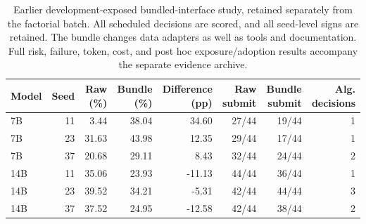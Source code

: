\begin{table}[t]
\centering\small
\setlength{\tabcolsep}{4pt}
\begin{tabular}{lrrrrrrr}
\toprule
Model & Seed & Raw (\%) & Bundle (\%) & Difference (pp) & Raw submit & Bundle submit & Alg. decisions \\
\midrule
7B & 11 & 3.44 & 38.04 & 34.60 & 27/44 & 19/44 & 1 \\
7B & 23 & 31.63 & 43.98 & 12.35 & 29/44 & 17/44 & 1 \\
7B & 37 & 20.68 & 29.11 & 8.43 & 32/44 & 24/44 & 2 \\
14B & 11 & 35.06 & 23.93 & -11.13 & 44/44 & 36/44 & 1 \\
14B & 23 & 39.52 & 34.21 & -5.31 & 42/44 & 44/44 & 3 \\
14B & 37 & 37.52 & 24.95 & -12.58 & 42/44 & 38/44 & 2 \\
\bottomrule
\end{tabular}
\caption{Earlier development-exposed bundled-interface study, retained separately from the factorial batch. All scheduled decisions are scored, and all seed-level signs are retained. The bundle changes data adapters as well as tools and documentation. Full risk, failure, token, cost, and post hoc exposure/adoption results accompany the separate evidence archive.}
\label{tab:prior-trading}
\end{table}
